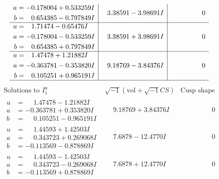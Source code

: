 \documentclass[1p]{elsarticle_modified}
\theoremstyle{definition}
\newcommand{\I}{\sqrt{-1}}
\begin{document}
$$\begin{array}{c|c|c}
\begin{aligned}
a &= -0.178004 + 0.533259 I \\
b &= \phantom{-}0.654385 - 0.797849 I\end{aligned}
 & \phantom{-}3.38591 - 3.98691 I & \phantom{-0.000000 } 0 \\ \hline\begin{aligned}
u &= \phantom{-}1.71474 - 0.65476 I \\
a &= -0.178004 - 0.533259 I \\
b &= \phantom{-}0.654385 + 0.797849 I\end{aligned}
 & \phantom{-}3.38591 + 3.98691 I & \phantom{-0.000000 } 0 \\ \hline\begin{aligned}
u &= \phantom{-}1.47478 + 1.21882 I \\
a &= -0.363781 - 0.353820 I \\
b &= \phantom{-}0.105251 + 0.965191 I\end{aligned}
 & \phantom{-}9.18769 - 3.84376 I & \phantom{-0.000000 } 0\\
 \hline 
 \end{array}$$\newpage$$\begin{array}{c|c|c}  
\text{Solutions to }I^u_{1}& \I (\text{vol} + \sqrt{-1}CS) & \text{Cusp shape}\\
 \hline 
\begin{aligned}
u &= \phantom{-}1.47478 - 1.21882 I \\
a &= -0.363781 + 0.353820 I \\
b &= \phantom{-}0.105251 - 0.965191 I\end{aligned}
 & \phantom{-}9.18769 + 3.84376 I & \phantom{-0.000000 } 0 \\ \hline\begin{aligned}
u &= \phantom{-}1.44593 + 1.42503 I \\
a &= \phantom{-}0.343723 + 0.269068 I \\
b &= -0.113569 - 0.878869 I\end{aligned}
 & \phantom{-}7.6878 - 12.4770 I & \phantom{-0.000000 } 0 \\ \hline\begin{aligned}
u &= \phantom{-}1.44593 - 1.42503 I \\
a &= \phantom{-}0.343723 - 0.269068 I \\
b &= -0.113569 + 0.878869 I\end{aligned}
 & \phantom{-}7.6878 + 12.4770 I & \phantom{-0.000000 } 0 \\ \hline\begin{aligned}

\end{aligned}
\end{array}$$
\end{document}
